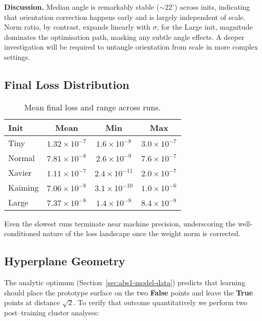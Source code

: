 \textbf{Discussion.}  
Median angle is remarkably stable ($\sim22^\circ$) across inits, indicating
that orientation correction happens early and is largely independent of scale.
Norm ratio, by contrast, expands linearly with $\sigma$; for the Large init,
magnitude dominates the optimisation path, masking any subtle angle effects.
A deeper investigation will be required to untangle orientation from scale in
more complex settings.

\subsection*{Final Loss Distribution}

\begin{table}[h]
\centering
\caption{Mean final loss and range across runs.}
\label{tab:init-loss}
\begin{tabular}{lccc}
\toprule
Init & Mean & Min & Max \\
\midrule
Tiny    & $1.32\times10^{-7}$ & $1.6\times10^{-8}$ & $3.0\times10^{-7}$ \\
Normal  & $7.81\times10^{-8}$ & $2.6\times10^{-9}$ & $7.6\times10^{-7}$ \\
Xavier  & $1.11\times10^{-7}$ & $2.4\times10^{-11}$ & $2.0\times10^{-7}$ \\
Kaiming & $7.06\times10^{-8}$ & $3.1\times10^{-10}$ & $1.0\times10^{-6}$ \\
Large   & $7.37\times10^{-8}$ & $1.4\times10^{-8}$ & $8.4\times10^{-8}$ \\
\bottomrule
\end{tabular}
\end{table}

Even the slowest runs terminate near machine precision, underscoring the
well-conditioned nature of the loss landscape once the weight norm is
corrected.

\subsection*{Hyperplane Geometry}
\label{sec:init-geometry}

The analytic optimum (Section~\ref{sec:abs1-model-data}) predicts that learning
should place the prototype surface on the two \textbf{False} points and leave
the \textbf{True} points at distance $\sqrt2$.  
To verify that outcome quantitatively we perform two post–training cluster
analyses:

